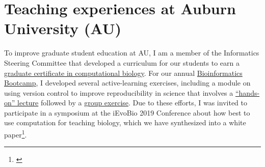 
\section*{Teaching experiences at Auburn University (AU)}
To improve graduate student education at AU,
I am a member of the Informatics Steering Committee that developed a
curriculum for our students to earn a
\href{http://bulletin.auburn.edu/thegraduateschool/graduatedegreesoffered/biologicalsciencesmsphd_major/computationalbiology_gradcert/}{graduate certificate in computational biology}.
For our annual
\href{http://www.auburn.edu/cosam/bioinformatics/}{Bioinformatics Bootcamp},
I developed several active-learning exercises,
including a module on using version control to improve reproducibility in
science that involves a
\href{http://phyletica.org/slides/git-intro/}{``hands-on'' lecture}
followed by a
\href{https://github.com/joaks1/au-bootcamp-git-intro}{group exercise}.
Due to these efforts, I was invited to participate in a symposium at the
iEvoBio 2019 Conference about how best to use computation for teaching biology,
which we have synthesized into a
white paper\footnote{\label{ievobiopaper}}.

